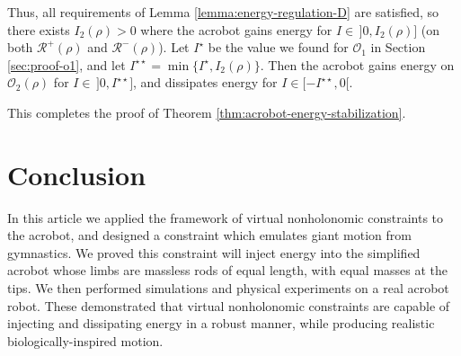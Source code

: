 \documentclass[journal,twoside,web, twocolumn,draftcls]{ieeecolor}
\begin{document}
Thus, all requirements of Lemma \ref{lemma:energy-regulation-D} are satisfied,
so there exists \(I_2(\rho) > 0\) where the acrobot
gains energy for \(I \in \, ]0,I_2(\rho)]\)
(on both \(\mathcal{R}^+(\rho)\) and \(\mathcal{R}^-(\rho)\)).
Let \(I^\star\) be the value we found for \(\mathcal{O}_1\) in 
Section \ref{sec:proof-o1}, and let
\(I^{\star\star} = \min \{I^\star, I_2(\rho)\}\).
Then the acrobot gains energy on \(\mathcal{O}_2(\rho)\)
for \(I \in \,]0, I^{\star\star}]\),
and dissipates energy for \(I \in [-I^{\star\star},0[\).

This completes the proof of Theorem \ref{thm:acrobot-energy-stabilization}.

\section{Conclusion}\label{sec:conclusion}

In this article we applied the framework of virtual nonholonomic constraints
to the acrobot, and designed a constraint which emulates giant motion from
gymnastics.
We proved this constraint will inject energy into the simplified acrobot whose
limbs are massless rods of equal length, with equal masses at the tips.
We then performed simulations and physical experiments on a real acrobot robot.
These demonstrated that virtual nonholonomic constraints are capable of
injecting and dissipating energy in a robust manner, while producing
realistic biologically-inspired motion.


\end{document}
